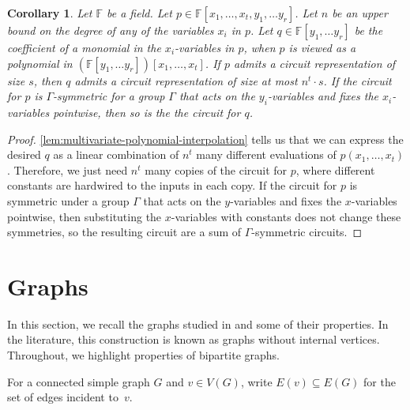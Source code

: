 \documentclass[10pt,a4paper]{article}
\theoremstyle{definition}
\theoremstyle{plain}
\newtheorem{corollary}[definition]{Corollary}
\theoremstyle{remark}
\newcommand{\bbF}{\mathbb{F}}
\begin{document}
	
	\begin{corollary}
		\label{cor:interpolationTrickCircuits}
		Let $\bbF$ be a field. 	
		Let $p \in \bbF[x_1, \dots, x_t, y_1,\dots y_r]$. 
		Let $n$ be an upper bound on the degree of any of the variables $x_i$ in $p$.
		Let $q \in \bbF[y_1,\dots y_r]$ be the coefficient of a monomial in the $x_i$-variables in $p$, when $p$ is viewed as a polynomial in $(\bbF[y_1,\dots y_r])[x_1,\dots, x_t]$.
		If $p$ admits a circuit representation of size $s$, then $q$ admits a circuit representation of size at most $n^t \cdot s$.
		If the circuit for $p$ is $\Gamma$-symmetric for a group $\Gamma$ that acts on the $y_i$-variables and fixes the $x_i$-variables pointwise, then so is the the circuit for $q$.
	\end{corollary}
	\begin{proof}
		\cref{lem:multivariate-polynomial-interpolation} tells us that we can express the desired $q$ as a linear combination of $n^t$ many different evaluations of $p(x_1, \dots, x_t)$. Therefore, we just need $n^t$ many copies of the circuit for $p$, where different constants are hardwired to the inputs in each copy.
		If the circuit for $p$ is symmetric under a group $\Gamma$ that acts on the $y$-variables and fixes the $x$-variables pointwise, then substituting the $x$-variables with constants does not change these symmetries, so the resulting circuit are a sum of $\Gamma$-symmetric circuits.
	\end{proof}	
	
	
	
	
	
	
	
	
	
	
	
	\section{ Graphs}
	\label{sec:cfi}
	In this section, we recall the  graphs studied in \cite{roberson_oddomorphisms_2022} and some of their properties.
	In the literature, this construction is known as  graphs without internal vertices.
	Throughout, we highlight properties of bipartite  graphs.
	
	For a connected simple graph $G$ and $v \in V(G)$, write $E(v) \subseteq E(G)$ for the set of edges incident to~$v$.
	
\end{document}
